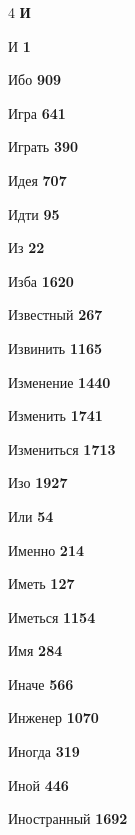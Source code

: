\begin{multicols}{4}
\vspace{0.6em}\noindent\textbf{\normalsize\sffamily\color{primary} И}\par\vspace{0.2em}
\noindent И \dotfill \textbf{\color{secondary} 1}\par
\noindent Ибо \dotfill \textbf{\color{secondary} 909}\par
\noindent Игра \dotfill \textbf{\color{secondary} 641}\par
\noindent Играть \dotfill \textbf{\color{secondary} 390}\par
\noindent Идея \dotfill \textbf{\color{secondary} 707}\par
\noindent Идти \dotfill \textbf{\color{secondary} 95}\par
\noindent Из \dotfill \textbf{\color{secondary} 22}\par
\noindent Изба \dotfill \textbf{\color{secondary} 1620}\par
\noindent Известный \dotfill \textbf{\color{secondary} 267}\par
\noindent Извинить \dotfill \textbf{\color{secondary} 1165}\par
\noindent Изменение \dotfill \textbf{\color{secondary} 1440}\par
\noindent Изменить \dotfill \textbf{\color{secondary} 1741}\par
\noindent Измениться \dotfill \textbf{\color{secondary} 1713}\par
\noindent Изо \dotfill \textbf{\color{secondary} 1927}\par
\noindent Или \dotfill \textbf{\color{secondary} 54}\par
\noindent Именно \dotfill \textbf{\color{secondary} 214}\par
\noindent Иметь \dotfill \textbf{\color{secondary} 127}\par
\noindent Иметься \dotfill \textbf{\color{secondary} 1154}\par
\noindent Имя \dotfill \textbf{\color{secondary} 284}\par
\noindent Иначе \dotfill \textbf{\color{secondary} 566}\par
\noindent Инженер \dotfill \textbf{\color{secondary} 1070}\par
\noindent Иногда \dotfill \textbf{\color{secondary} 319}\par
\noindent Иной \dotfill \textbf{\color{secondary} 446}\par
\noindent Иностранный \dotfill \textbf{\color{secondary} 1692}\par

\end{multicols}
